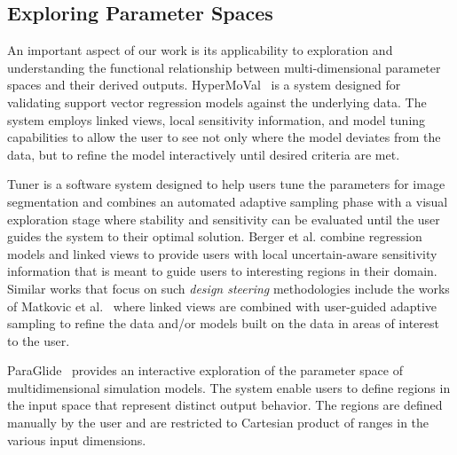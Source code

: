 


\subsection{Exploring Parameter Spaces}

An important aspect of our work is its applicability to exploration and understanding the functional relationship between multi-dimensional parameter spaces and their derived outputs.
%
HyperMoVal~\cite{Piringer2010} is a system designed for validating support vector regression models against the underlying data.
%
The system employs linked views, local sensitivity information, and model tuning capabilities to allow the user to see not only where the model deviates from the data, but to refine the model interactively until desired criteria are met.

Tuner is a software system designed to help users tune the parameters for image segmentation and combines an automated adaptive sampling phase with a visual exploration stage where stability and sensitivity can be evaluated until the user guides the system to their optimal solution.
%
Berger et al. combine regression models and linked views to provide users with local uncertain-aware sensitivity information that is meant to guide users to interesting regions in their domain.
%
Similar works that focus on such \textit{design steering} methodologies include the works of Matkovic et al.~\cite{Matkovic14, Splechtna15, Matkovic18} where linked views are combined with user-guided adaptive sampling to refine the data and/or models built on the data in areas of interest to the user.


ParaGlide~\cite{Bergner13} provides an interactive exploration of the parameter space of multidimensional simulation models. The system enable users to define regions in the input space that represent distinct output behavior. The regions are defined manually by the user and are restricted to Cartesian product of ranges in the various input dimensions. 

